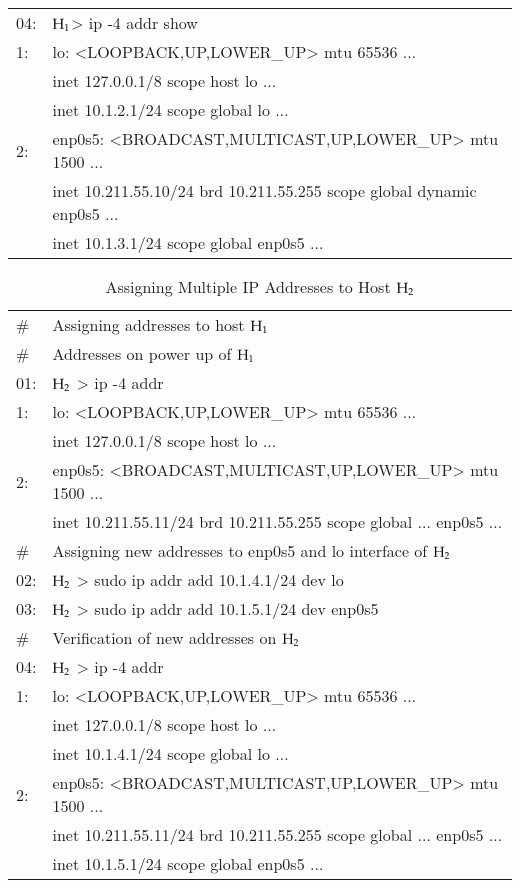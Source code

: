 \begin{multicols}{2}
\begin{table}[H]
\begin{tabular}{|l@{\;}l|}
04:& ${\rm H}_{1}$> ip -4 addr show\\
1: & lo: <LOOPBACK,UP,LOWER\_UP> mtu 65536 $\ldots$\\
   &\quad inet 127.0.0.1/8 scope host lo $\ldots$\\
   & \quad inet 10.1.2.1/24 scope global lo $\ldots$\\
2: & enp0s5: <BROADCAST,MULTICAST,UP,LOWER\_UP> mtu 1500 $\ldots$\\
   & \quad inet 10.211.55.10/24 brd 10.211.55.255 scope global dynamic enp0s5 $\ldots$\\
   &\quad inet 10.1.3.1/24 scope global enp0s5 $\ldots$\\
   \hline   
\end{tabular}
\end{table}

\begin{table}[H]
\caption{Assigning Multiple IP Addresses to Host ${\rm H}_{2}$}\label{chap2-table-5}
\begin{tabular}{|l@{\;}l|}
\hline
\# & Assigning addresses to host ${\rm H}_{1}$\\
\# & Addresses on power up of ${\rm H}_{1}$\\
01:& ${\rm H}_{2}$ > ip -4 addr\\
1: & lo: <LOOPBACK,UP,LOWER\_UP> mtu 65536 $\ldots$\\
    &\quad inet 127.0.0.1/8 scope host lo $\ldots$\\
2: & enp0s5: <BROADCAST,MULTICAST,UP,LOWER\_UP> mtu 1500 $\ldots$\\
   & \quad inet 10.211.55.11/24 brd 10.211.55.255 scope global $\ldots$ enp0s5 $\ldots$\\
    \hline
\# & Assigning new addresses to enp0s5 and lo interface of ${\rm H}_{2}$\\
02: & ${\rm H}_{2}$ > sudo ip addr add 10.1.4.1/24 dev lo\\
03: & ${\rm H}_{2}$ > sudo ip addr add 10.1.5.1/24 dev enp0s5\\
\hline
\# & Verification of new addresses on ${\rm H}_{2}$\\
04:& ${\rm H}_{2}$ > ip -4 addr\\
1:& lo: <LOOPBACK,UP,LOWER\_UP> mtu 65536 $\ldots$\\
   & \quad inet 127.0.0.1/8 scope host lo $\dots$\\
   &  \quad inet 10.1.4.1/24 scope global lo $\ldots$\\
  \hline 
2:& enp0s5: <BROADCAST,MULTICAST,UP,LOWER\_UP> mtu 1500 $\ldots$\\
   & \quad inet 10.211.55.11/24 brd 10.211.55.255 scope global $\ldots$ enp0s5 $\ldots$\\
   & \quad inet 10.1.5.1/24 scope global enp0s5 $\ldots$\\
   \hline
\end{tabular}
\end{table}


\end{multicols}
